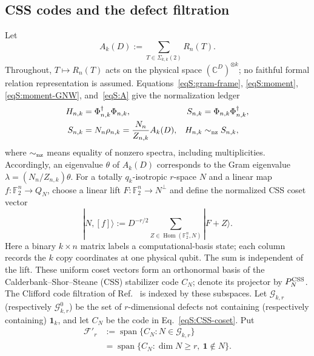 \documentclass[journal,twocolumn]{IEEEtran}
\theoremstyle{definition}
\theoremstyle{plain}
\newcommand{\F}{\mathbb F}
\newcommand{\one}{\bm 1}
\newcommand{\cG}{\mathcal G}
\begin{document}
\subsection{CSS codes and the defect filtration}
Let
\begin{equation}
 A_k(D):=\sum_{T\in\Sigma_{k,k}(2)}R_n(T).
 \label{eqS:A}
\end{equation}
Throughout, $T\mapsto R_n(T)$ acts on the physical space
$(\mathbb C^D)^{\otimes k}$; no faithful formal relation representation is
assumed.  Equations~\eqref{eqS:gram-frame}, \eqref{eqS:moment},
\eqref{eqS:moment-GNW}, and~\eqref{eqS:A} give the normalization ledger
\begin{equation*}
 \begin{aligned}
 H_{n,k}&=\Phi_{n,k}^{\dagger}\Phi_{n,k},&
 S_{n,k}&=\Phi_{n,k}\Phi_{n,k}^{\dagger},\\
 S_{n,k}&=N_n\rho_{n,k}
          =\frac{N_n}{Z_{n,k}}A_k(D),&
 H_{n,k}&\sim_{\rm nz}S_{n,k},
 \end{aligned}
\end{equation*}
where $\sim_{\rm nz}$ means equality of nonzero spectra, including
multiplicities.  Accordingly, an eigenvalue $\theta$ of $A_k(D)$ corresponds
to the Gram eigenvalue $\lambda=(N_n/Z_{n,k})\theta$.
For a totally $q_k$-isotropic $r$-space $N$ and a linear map
$f:\F_2^n\to Q_N$, choose a linear lift
$F:\F_2^n\to N^\perp$ and define the normalized CSS coset vector
\begin{equation}
 |N,[f]\rangle:=
 D^{-r/2}\sum_{Z\in\operatorname{Hom}(\F_2^n,N)}|F+Z\rangle .
 \label{eqS:CSS-coset}
\end{equation}
Here a binary $k\times n$ matrix labels a computational-basis state; each
column records the $k$ copy coordinates at one physical qubit.  The sum is
independent of the lift.  These uniform coset vectors form an orthonormal
basis of the Calderbank--Shor--Steane (CSS) stabilizer code $C_N$; denote its
projector by $P_N^{\rm CSS}$.  The
Clifford code filtration of Ref.~\cite{MontealegreGross2025} is indexed by
these subspaces.  Let
$\cG_{k,r}$ (respectively $\cG^0_{k,r}$) be the set of $r$-dimensional
defects not containing (respectively containing) $\one_k$, and let $C_N$ be
the code in Eq.~\eqref{eqS:CSS-coset}.  Put
\begin{equation}
 \begin{aligned}
 \mathcal F'_r&:=\operatorname{span}\{C_N:N\in\cG_{k,r}\}\\
 &=\operatorname{span}\{C_N:\dim N\geq r,\ \one\notin N\}.
 \end{aligned}
 \label{eqS:raw-filtration}
\end{equation}
\end{document}
